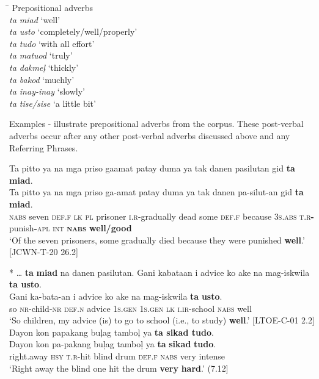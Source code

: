 \ea
\label{bkm:Ref441309255}
\begin{tabbing}
\hspace{2cm} \= \kill
Prepositional adverbs \\
\textit{ta miad} \> ‘well’ \\
\textit{ta usto} \> ‘completely/well/properly’ \\
\textit{ta tudo} \> ‘with all effort’ \\
\textit{ta matuod} \> ‘truly’ \\
\textit{ta dakmeļ} \> ‘thickly’ \\
\textit{ta bakod} \> ‘muchly’ \\
\textit{ta inay-inay} \> ‘slowly’ \\
\textit{ta tise/sise} \> ‘a little bit’
\end{tabbing}
\z

Examples - illustrate prepositional adverbs from the corpus. These post-verbal adverbs occur after any other post-verbal adverbs discussed above and any Referring Phrases.

\ea
\label{bkm:Ref423465666}
Ta pitto ya na mga priso gaamat patay duma ya tak danen pasilutan gid \textbf{ta miad}. \\\smallskip
 \gll Ta  pitto  ya  na  mga  priso  ga-amat  patay  duma  ya  tak danen  pa-silut-an  gid  \textbf{ta}  \textbf{miad}. \\
\textsc{nabs}  seven  \textsc{def.f}  \textsc{lk}  \textsc{pl}  prisoner  \textsc{i.r}-gradually  dead  some  \textsc{def.f}  because
3\textsc{s.abs}  \textsc{t.r}\textbf{-}punish\textbf{-}\textsc{apl}  \textsc{int}  \textbf{\textsc{nabs}}  \textbf{well/good} \\
\glt `Of the seven prisoners, some gradually died because they were punished \textbf{well}.’ [JCWN-T-20 26.2] \\\smallskip

* … \textbf{ta} \textbf{miad} na danen pasilutan.
\z
\ea
Gani kabataan i advice ko ake na mag-iskwila \textbf{ta usto}. \\\smallskip
 \gll Gani  ka-bata-an  i  advice  ko  ake  na  mag-iskwila  \textbf{ta}  \textbf{usto}. \\
so  \textsc{nr}-child-\textsc{nr}  \textsc{def.n}  advice  1\textsc{s.gen}  1\textsc{s.gen}  \textsc{lk}  \textsc{i.ir}-school  \textsc{nabs}  well \\
\glt ‘So children, my advice (is) to go to school (i.e., to study) \textbf{well}.’ [LTOE-C-01 2.2]
\z
\ea
\label{bkm:Ref423465676}
Dayon kon papakang buļag tamboļ ya \textbf{ta sikad tudo}. \\\smallskip
 \gll Dayon  kon  pa-pakang  buļag  tamboļ  ya  \textbf{ta}  \textbf{sikad}  \textbf{tudo}. \\
right.away  \textsc{hsy}  \textsc{t.r}-hit  blind  drum  \textsc{def.f}  \textsc{nabs}  very  intense \\
\glt ‘Right away the blind one hit the drum \textbf{very} \textbf{hard}.’ (7.12]
\z
